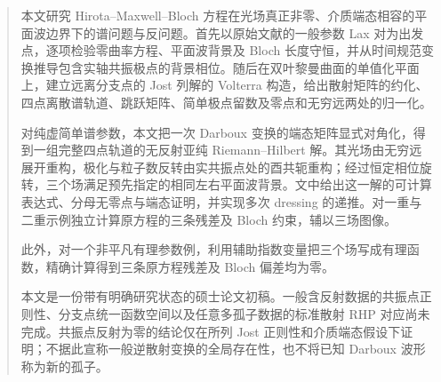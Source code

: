 \begin{abstract}
本文研究 Hirota–Maxwell–Bloch 方程在光场真正非零、介质端态相容的平面波边界下的谱问题与反问题。首先以原始文献的一般参数 Lax 对为出发点，逐项检验零曲率方程、平面波背景及 Bloch 长度守恒，并从时间规范变换推导包含实轴共振极点的背景相位。随后在双叶黎曼曲面的单值化平面上，建立远离分支点的 Jost 列解的 Volterra 构造，给出散射矩阵的约化、四点离散谱轨道、跳跃矩阵、简单极点留数及零点和无穷远两处的归一化。

对纯虚简单谱参数，本文把一次 Darboux 变换的端态矩阵显式对角化，得到一组完整四点轨道的无反射亚纯 Riemann–Hilbert 解。其光场由无穷远展开重构，极化与粒子数反转由实共振点处的酉共轭重构；经过恒定相位旋转，三个场满足预先指定的相同左右平面波背景。文中给出这一解的可计算表达式、分母无零点与端态证明，并实现多次 dressing 的递推。对一重与二重示例独立计算原方程的三条残差及 Bloch 约束，辅以三场图像。

此外，对一个非平凡有理参数例，利用辅助指数变量把三个场写成有理函数，精确计算得到三条原方程残差及 Bloch 偏差均为零。

本文是一份带有明确研究状态的硕士论文初稿。一般含反射数据的共振点正则性、分支点统一函数空间以及任意多孤子数据的标准散射 RHP 对应尚未完成。共振点反射为零的结论仅在所列 Jost 正则性和介质端态假设下证明；不据此宣称一般逆散射变换的全局存在性，也不将已知 Darboux 波形称为新的孤子。
\end{abstract}
